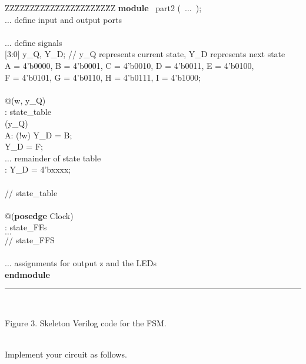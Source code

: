 \documentclass[epsfig,10pt,fullpage]{article}
\begin{document}
\begin{center}
\begin{minipage}[t]{12.5 cm}
\begin{tabbing}
ZZ\=ZZ\=ZZ\=ZZ\=ZZ\=ZZ\=ZZ\=ZZ\=ZZ\=ZZ\=ZZ\kill
{\bf module} ~part2 (~$\ldots$~);\\
\>$\ldots$ define input and output ports\\
~\\
\>$\ldots$ define signals\\
 [3:0] y\_Q, Y\_D;  \>\>\>\>\>\>\>\>// y\_Q represents current state, Y\_D represents next state\\
 A = 4'b0000, B = 4'b0001, C = 4'b0010, D = 4'b0011, E = 4'b0100,\\
\>\>F = 4'b0101, G = 4'b0110, H = 4'b0111, I = 4'b1000;\\
~\\
 @(w, y\_Q)\\
: state\_table\\
\> (y\_Q)\\
\>\>\>A:	 (!w) Y\_D = B;\\
\>\>\> Y\_D = F;\\
\>\>\>$\ldots$ remainder of state table \\
\>\>: Y\_D = 4'bxxxx;\\
\>\\
 // state\_table\\
\\
 @({\bf posedge} Clock)\\
: state\_FFs\\
\>\>$\ldots$ \\
 // state\_FFS\\
\\
\>$\ldots$ assignments for output z and the LEDs\\
{\bf endmodule}
~\rule{5.0in}{0in}\\
\end{tabbing}
\end{minipage}
\end{center}

\begin{center}
Figure 3. Skeleton Verilog code for the FSM.
\end{center}
~\\
Implement your circuit as follows.
\end{document}
